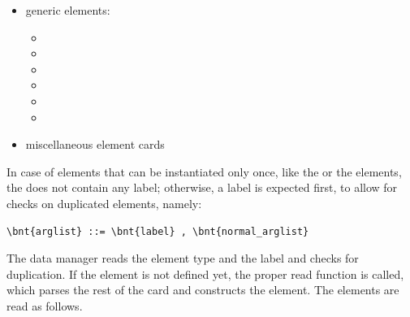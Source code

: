 \begin{itemize}
\item generic elements:
\begin{itemize}
\item {}
\item {}
\item {}
\item {}
\item {}
\item {}
\end{itemize}

\item miscellaneous element cards
\end{itemize}


In case of elements that can be instantiated only once, like
the  or the  elements, the 
does not contain any label; otherwise, a label is expected first, to allow 
for checks on duplicated elements, namely: 
\begin{Verbatim}[commandchars=\\\{\}]
    \bnt{arglist} ::= \bnt{label} , \bnt{normal_arglist}
\end{Verbatim}
The data manager reads the element type and the label and checks for
duplication. If the element is not defined yet, the proper read function is
called, which parses the rest of the card and constructs the element.
The elements are read as follows.







